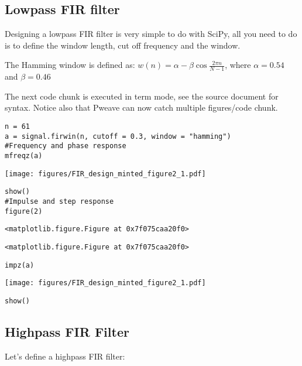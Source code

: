 \documentclass[a4paper,11pt,final]{article}
\begin{document}
\subsection{Lowpass FIR filter}

Designing a lowpass FIR filter is very simple to do with SciPy, all you
need to do is to define the window length, cut off frequency and the
window.

The Hamming window is defined as:
$w(n) = \alpha - \beta\cos\frac{2\pi n}{N-1}$, where $\alpha=0.54$ and
$\beta=0.46$

The next code chunk is executed in term mode, see the source document
for syntax. Notice also that Pweave can now catch multiple
figures/code chunk.


\begin{verbatim}
n = 61
a = signal.firwin(n, cutoff = 0.3, window = "hamming")
#Frequency and phase response
mfreqz(a)
\end{verbatim}
\texttt{[image: figures/FIR\_design\_minted\_figure2\_1.pdf]}

\begin{verbatim}
show()
#Impulse and step response
figure(2)
\end{verbatim}
\begin{verbatim}
<matplotlib.figure.Figure at 0x7f075caa20f0>
\end{verbatim}
\begin{verbatim}
<matplotlib.figure.Figure at 0x7f075caa20f0>
\end{verbatim}

\begin{verbatim}
impz(a)
\end{verbatim}
\texttt{[image: figures/FIR\_design\_minted\_figure2\_1.pdf]}

\begin{verbatim}
show()
\end{verbatim}


\subsection{Highpass FIR Filter}

Let's define a highpass FIR filter:
\end{document}
